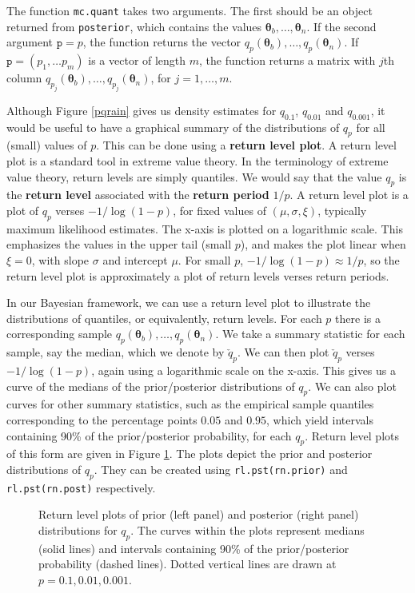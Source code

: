 \documentclass[11pt,a4paper]{article}
\newcommand{\bs}{\boldsymbol}
\begin{document}
The function \verb+mc.quant+  takes two arguments.
The first should be an object returned from \verb+posterior+, which contains the values $\bs{\theta}_b, \dots, \bs{\theta}_n$.
If the second argument $\texttt{p} = p$, the function returns the vector $q_p(\bs{\theta}_b), \dots, q_p(\bs{\theta}_n)$.
If $\texttt{p} = (p_1, \dots p_m)$ is a vector of length $m$, the function returns a matrix with $j$th column $q_{p_j}(\bs{\theta}_b), \dots, q_{p_j}(\bs{\theta}_n)$, for $j=1,\dots,m$.  

Although Figure \ref{pqrain} gives us density estimates for $q_{0.1}$, $q_{0.01}$  and $q_{0.001}$, it would be useful to have a graphical summary of the distributions of $q_p$ for all (small) values of $p$.
This can be done using a \textbf{return level plot}.
A return level plot is a standard tool in extreme value theory.
In the terminology of extreme value theory, return levels are simply quantiles.
We would say that the value $q_p$ is the \textbf{return level} associated with the \textbf{return period} $1/p$.
A return level plot is a plot of $q_p$ verses $-1/\log(1-p)$, for fixed values of $(\mu,\sigma,\xi)$, typically maximum likelihood estimates.
The x-axis is plotted on a logarithmic scale.
This emphasizes the values in the upper tail (small $p$), and makes the plot linear when $\xi=0$, with slope $\sigma$ and intercept $\mu$.
For small $p$, $-1/\log(1-p) \approx 1/p$, so the return level plot is approximately a plot of return levels verses return periods.

In our Bayesian framework, we can use a return level plot to illustrate the distributions of quantiles, or equivalently, return levels.
For each $p$ there is a corresponding sample $q_{p}(\bs{\theta}_b), \dots, q_{p}(\bs{\theta}_n)$.
We take a summary statistic for each sample, say the median, which we denote by $\check{q}_{p}$.
We can then plot $\check{q}_{p}$ verses $-1/\log(1-p)$, again using a logarithmic scale on the x-axis.
This gives us a curve of the medians of the prior/posterior distributions of $q_p$.
We can also plot curves for other summary statistics, such as the empirical sample quantiles corresponding to the percentage points $0.05$ and $0.95$, which yield intervals containing 90\% of the prior/posterior probability, for each $q_p$.
Return level plots of this form are given in Figure \ref{rlrain}.
The plots depict the prior and posterior distributions of $q_p$.
They can be created using \verb+rl.pst(rn.prior)+ and \verb+rl.pst(rn.post)+
respectively.

\begin{figure}
\begin{center}
\vspace{-1.5cm}
\hspace{0cm}
\end{center}
\caption{Return level plots of prior (left panel) and posterior (right panel) distributions for $q_p$. The curves within the plots represent medians (solid lines) and intervals containing 90\% of the prior/posterior probability (dashed lines). Dotted vertical lines are drawn at $p = 0.1, 0.01, 0.001$.}
\label{rlrain}
\end{figure}
\end{document}

